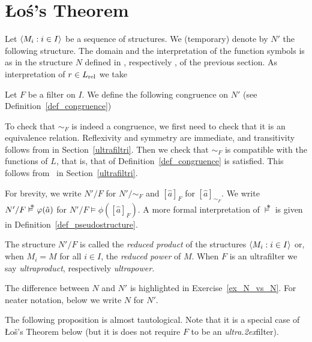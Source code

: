 \section{\L o\'{s}'s Theorem}
Let $\langle M_i:i\in I\rangle$ be a sequence of structures.
We (temporary) denote by $N'$ the following structure.
The domain and the interpretation of the function symbols is as in the structure $N$ defined in , respectively , of the previous section.
As interpretation of $r\in L_{\rm rel}$ we take


Let $F$ be a filter on $I$.
We define the following congruence on $N'$ (see Definition~\ref{def_congruence})


To check that $\sim_F$ is indeed a congruence, we first need to check that it is an equivalence relation. Reflexivity and symmetry are immediate, and transitivity follows from  in Section~\ref{ultrafiltri}. Then we check that $\sim_F$ is compatible with the functions of $L$, that is, that  of Definition~\ref{def_congruence} is satisfied. This follows from~ in Section~\ref{ultrafiltri}.

For brevity, we write $N'/F$ for $N'/{\sim}_F$ and $[\hat a]_F$ for $[\hat a]_{\sim_F}$.
We write $N'/F\pmodels\phi(\hat a)$ for $N'/F\models\phi([\hat a]_F)$.
A more formal interpretation of $\,\pmodels\,$ is given in Definition~\ref{def_pseudostructure}.

The structure $N'/F$ is called the \emph{reduced product\/} of the structures $\langle M_i:i\in I\rangle$ or, when $M_i=M$ for all $i\in I$, the \emph{reduced power\/} of $M$. When $F$ is an ultrafilter we say \emph{ultraproduct}, respectively \emph{ultrapower.}

The difference between $N$ and $N'$ is highlighted in Exercise~\ref{ex_N_vs_N}.
For neater notation, below we write $N$ for $N'$.

The following proposition is almost tautological.
Note that it is a special case of \L o\v{s}'s Theorem below (but it is does not require $F$ to be an \textit{ultra\kern.2ex}filter).

